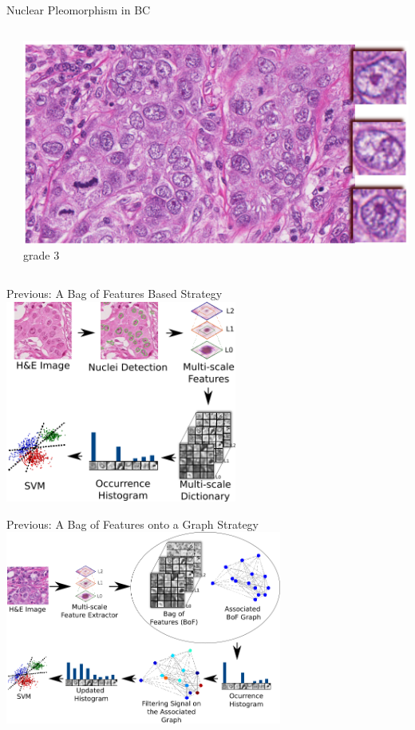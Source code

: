 \documentclass[usenames,dvipsnames]{beamer}
\begin{document}
\begin{frame}{Nuclear Pleomorphism in BC}
{\begin{columns}
\begin{column}{0.33\textwidth}
\end{column}

\begin{column}{0.33\textwidth}
\includegraphics[width=\textwidth]{imagenes/grado3.png}
\\\centering \scriptsize grade 3

\end{column}

\end{columns}
      
  }
\end{frame}


\begin{frame}{Previous: A Bag of Features Based Strategy }
\centering\includegraphics[width=0.57\textwidth]{imagenes/metodo_sustentacion.png}
\end{frame}
\begin{frame}{Previous: A Bag of Features onto a Graph Strategy}
\centering\includegraphics[width=0.68\textwidth]{imagenes/metodo_sipaim2017.png}
\end{frame}
\end{document}
